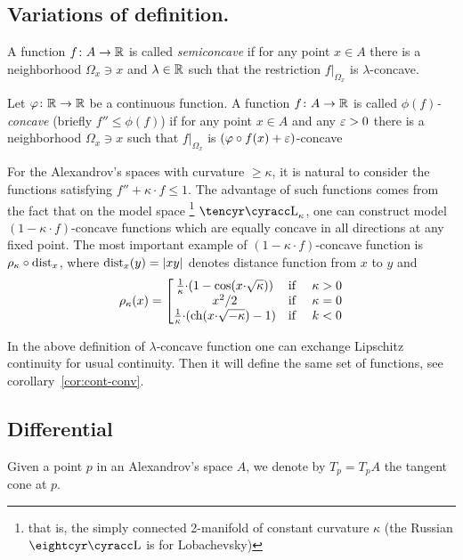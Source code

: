 \documentclass{article}
\begin{document}
\subsection{Variations of definition.}\label{variation-CF}

A function $f\colon A\to \mathbb{R}$ is called \textit{semiconcave} if for any point $x\in A$ there is a neighborhood $\Omega_x\ni x$ and $\lambda\in \mathbb{R}$ such that the restriction $f|_{\Omega_x}$ is $\lambda$-concave.

Let $\varphi\colon\mathbb{R}\to \mathbb{R}$ be a continuous function. 
A function $f\colon A\to \mathbb{R}$ is called \emph{$\phi(f)$-concave} (briefly $f''\le \phi(f)$) if for any point $x\in A$ and any $\varepsilon>0$ there is a neighborhood $\Omega_x\ni x$ such that $f|_{\Omega_x}$ is $(\varphi\circ f(x)+\varepsilon)$-concave

For the Alexandrov's spaces with curvature $\ge \kappa$, it is natural to consider the functions satisfying $f''+\kappa{\cdot}f\le 1$.
The advantage of such functions comes from the fact that on the model space%
\footnote{\label{Lob_k} that is, 
the simply connected 2-manifold of constant curvature $\kappa$ 
(the Russian $\Lobm$ is for Lobachevsky)}  
$\Lob_\kappa$,  one can construct model $(1-\kappa{\cdot} f)$-concave functions which are equally concave in all directions at any fixed point.
The most important example of $(1-\kappa{\cdot} f)$-concave function is $\rho_\kappa\circ\operatorname{dist}_x$, where $\operatorname{dist}_x(y)=|x y|$ denotes distance function from $x$ to $y$ and
$$\label{rho_k}\rho_\kappa(x) =
\left[\begin{matrix} 
\tfrac1\kappa{\cdot} (1-\cos(x{\cdot}\sqrt{\kappa} ))  & {\text{if }} & \kappa > 0 \\
 x^2/2                          & {\text{if }} & \kappa=0 \\
\tfrac1\kappa {\cdot}(\operatorname{ch}(x{\cdot}\sqrt{-\kappa})-1) & {\text{if }} & k < 0
\end{matrix}\right.$$

In the above definition of $\lambda$-concave function one can exchange Lipschitz continuity for usual continuity. 
Then it will define the same set of functions, see corollary~\ref{cor:cont-conv}.





\subsection{Differential} 

Given a point $p$ in an Alexandrov's space  $A$, we denote by \label{T_p} $T_p=T_p A$ the tangent cone at $p$.
\end{document}
